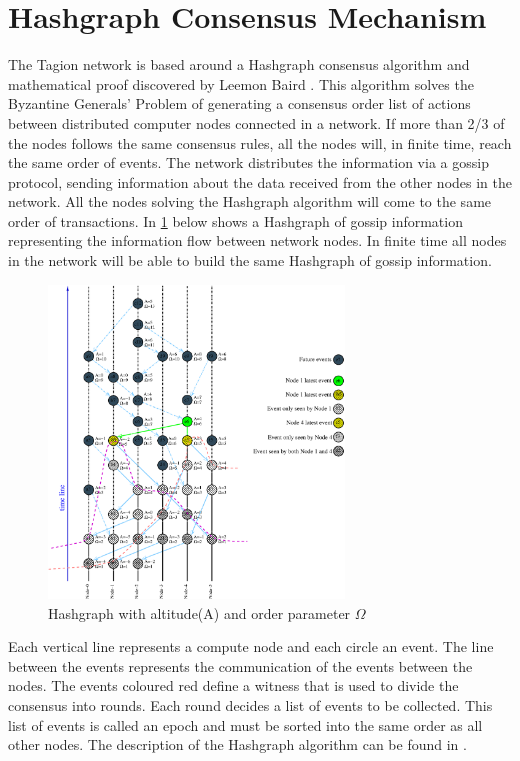 \section{Hashgraph Consensus Mechanism} 
\label{sec:hashgraph_cm}
The Tagion network is based around a Hashgraph consensus algorithm and mathematical proof discovered by Leemon Baird \cite{SWIRLDS_HASHGRAPH}. This algorithm solves the Byzantine Generals’ Problem of generating a consensus order list of actions between distributed computer nodes connected in a network.
If more than 2/3 of the nodes follows the same consensus rules, all the nodes will, in finite time, reach the same order of events.
The network distributes the information via a gossip protocol, sending information about the data received from the other nodes in the network. All the nodes solving the Hashgraph algorithm will come to the same order of transactions.
In \cref{fig:wavefront} below shows a Hashgraph of gossip information representing the information flow between network nodes. In finite time all nodes in the network will be able to build the same Hashgraph of gossip information.
\begin{figure}[ht]
 \centering
 \includegraphics[width=0.7\textwidth]{fig/wavefront_and_order_long.eps}
 \caption{Hashgraph with altitude(A) and order parameter $\Omega$}
 \label{fig:wavefront}
\end{figure}

Each vertical line represents a compute node and each circle an event. The line between the events represents the communication of the events between the nodes. 
The events coloured red define a witness that is used to divide the consensus into rounds. Each round decides a list of events to be collected. This list of events is called an epoch and must be sorted into the same order as all other nodes. The description of the Hashgraph algorithm can be found in \cite{SWIRLDS_HASHGRAPH}.
\pagebreak


\pagebreak


